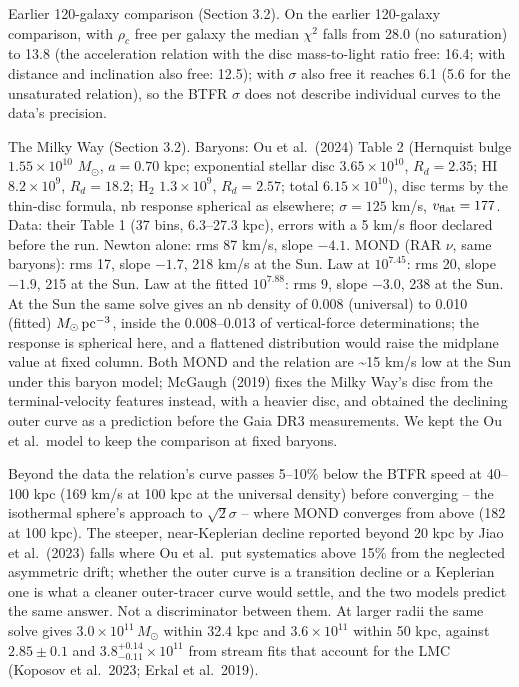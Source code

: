 \documentclass[
  10pt,
]{article}
\begin{document}
Earlier 120-galaxy comparison (Section 3.2). On the earlier 120-galaxy comparison, with $\rho_c$ free per galaxy the median $\chi^2$ falls from 28.0 (no saturation) to 13.8 (the acceleration relation with the disc mass-to-light ratio free: 16.4; with distance and inclination also free: 12.5); with $\sigma$ also free it reaches 6.1 (5.6 for the unsaturated relation), so the BTFR $\sigma$ does not describe individual curves to the data's precision.

The Milky Way (Section 3.2). Baryons: Ou et al.~(2024) Table 2 (Hernquist bulge $1.55\times10^{10}$ $M_\odot$, $a=0.70$ kpc; exponential stellar disc $3.65\times10^{10}$, $R_d=2.35$; HI $8.2\times10^{9}$, $R_d=18.2$; H$_2$ $1.3\times10^{9}$, $R_d=2.57$; total $6.15\times10^{10}$), disc terms by the thin-disc formula, nb response spherical as elsewhere; $\sigma=125$ km/s, $v_{\rm flat}=177$. Data: their Table 1 (37 bins, 6.3--27.3 kpc), errors with a 5 km/s floor declared before the run. Newton alone: rms 87 km/s, slope $-4.1$. MOND (RAR $\nu$, same baryons): rms 17, slope $-1.7$, 218 km/s at the Sun. Law at $10^{7.45}$: rms 20, slope $-1.9$, 215 at the Sun. Law at the fitted $10^{7.88}$: rms 9, slope $-3.0$, 238 at the Sun. At the Sun the same solve gives an nb density of 0.008 (universal) to 0.010 (fitted) $M_\odot\,{\rm pc}^{-3}$, inside the 0.008--0.013 of vertical-force determinations; the response is spherical here, and a flattened distribution would raise the midplane value at fixed column. Both MOND and the relation are \textasciitilde{}15 km/s low at the Sun under this baryon model; McGaugh (2019) fixes the Milky Way's disc from the terminal-velocity features instead, with a heavier disc, and obtained the declining outer curve as a prediction before the Gaia DR3 measurements. We kept the Ou et al.\ model to keep the comparison at fixed baryons.

Beyond the data the relation's curve passes 5--10\% below the BTFR speed at 40--100 kpc (169 km/s at 100 kpc at the universal density) before converging -- the isothermal sphere's approach to $\sqrt{2}\sigma$ -- where MOND converges from above (182 at 100 kpc). The steeper, near-Keplerian decline reported beyond 20 kpc by Jiao et al.~(2023) falls where Ou et al.\ put systematics above 15\% from the neglected asymmetric drift; whether the outer curve is a transition decline or a Keplerian one is what a cleaner outer-tracer curve would settle, and the two models predict the same answer. Not a discriminator between them. At larger radii the same solve gives $3.0\times10^{11}\,M_\odot$ within 32.4 kpc and $3.6\times10^{11}$ within 50 kpc, against $2.85\pm0.1$ and $3.8^{+0.14}_{-0.11}\times10^{11}$ from stream fits that account for the LMC (Koposov et al.~2023; Erkal et al.~2019).
\end{document}
